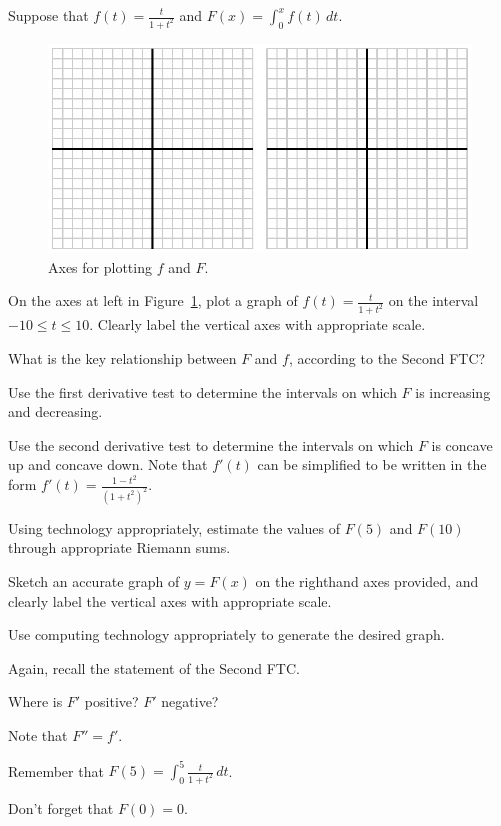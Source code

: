\begin{activity} \label{A:5.2.2}  Suppose that $f(t) = \frac{t}{1+t^2}$ and $F(x) = \int_0^x f(t) \, dt$.

\begin{figure}[h]
\begin{center}
\includegraphics{figures/5_2_Act2.eps}
\end{center}
\caption{Axes for plotting $f$ and $F$.} \label{F:5.2.Act2}
\end{figure}
\ba
	\item On the axes at left in Figure~\ref{F:5.2.Act2}, plot a graph of $f(t) = \frac{t}{1+t^2}$ on the interval $-10 \le t \le 10$.  Clearly label the vertical axes with appropriate scale.
	\item What is the key relationship between $F$ and $f$, according to the Second FTC?
	\item Use the first derivative test to determine the intervals on which $F$ is increasing and decreasing.
	\item Use the second derivative test to determine the intervals on which $F$ is concave up and concave down.  Note that $f'(t)$ can be simplified to be written in the form $f'(t) = \frac{1-t^2}{(1+t^2)^2}.$
	\item Using technology appropriately, estimate the values of $F(5)$ and $F(10)$ through appropriate Riemann sums.
	\item Sketch an accurate graph of $y = F(x)$ on the righthand axes provided, and clearly label the vertical axes with appropriate scale.
\ea
\end{activity}
\begin{smallhint}
\ba
	\item Use computing technology appropriately to generate the desired graph.
	\item Again, recall the statement of the Second FTC.
	\item Where is $F'$ positive?  $F'$ negative?
	\item Note that $F'' = f'$.
	\item Remember that $F(5) = \int_0^5 \frac{t}{1+t^2} \, dt$.
	\item Don't forget that $F(0) = 0$.
\ea
\end{smallhint}
